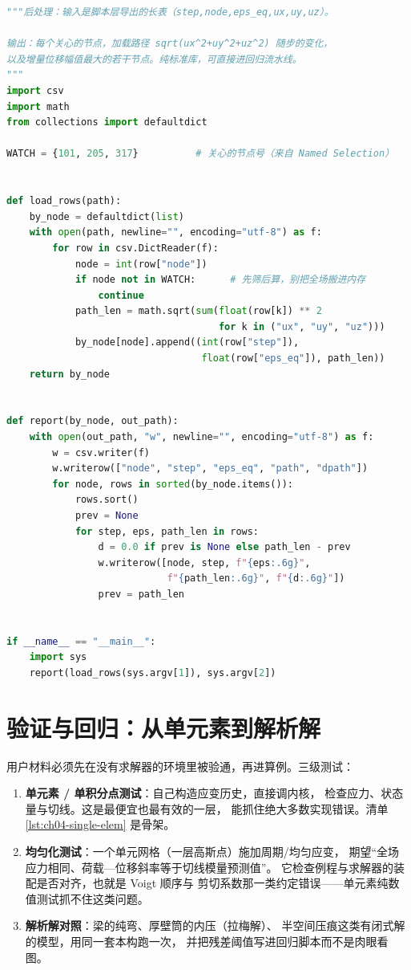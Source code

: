 \documentclass[12pt,a4paper,fontset=fandol]{ctexbook}
\begin{document}
\begin{lstlisting}[language=Python, style=pythonstyle, caption={结果后处理：从导出的长表算自定义量并只留子集}, label={lst:ch04-post}]
"""后处理：输入是脚本层导出的长表（step,node,eps_eq,ux,uy,uz）。

输出：每个关心的节点，加载路径 sqrt(ux^2+uy^2+uz^2) 随步的变化，
以及增量位移幅值最大的若干节点。纯标准库，可直接进回归流水线。
"""
import csv
import math
from collections import defaultdict

WATCH = {101, 205, 317}          # 关心的节点号（来自 Named Selection）


def load_rows(path):
    by_node = defaultdict(list)
    with open(path, newline="", encoding="utf-8") as f:
        for row in csv.DictReader(f):
            node = int(row["node"])
            if node not in WATCH:      # 先筛后算，别把全场搬进内存
                continue
            path_len = math.sqrt(sum(float(row[k]) ** 2
                                     for k in ("ux", "uy", "uz")))
            by_node[node].append((int(row["step"]),
                                  float(row["eps_eq"]), path_len))
    return by_node


def report(by_node, out_path):
    with open(out_path, "w", newline="", encoding="utf-8") as f:
        w = csv.writer(f)
        w.writerow(["node", "step", "eps_eq", "path", "dpath"])
        for node, rows in sorted(by_node.items()):
            rows.sort()
            prev = None
            for step, eps, path_len in rows:
                d = 0.0 if prev is None else path_len - prev
                w.writerow([node, step, f"{eps:.6g}",
                            f"{path_len:.6g}", f"{d:.6g}"])
                prev = path_len


if __name__ == "__main__":
    import sys
    report(load_rows(sys.argv[1]), sys.argv[2])
\end{lstlisting}

\section{验证与回归：从单元素到解析解}
\label{sec:ch04-verify}

用户材料必须先在没有求解器的环境里被验通，再进算例。三级测试：

\begin{enumerate}
  \item \textbf{单元素 / 单积分点测试}：自己构造应变历史，直接调内核，
        检查应力、状态量与切线。这是最便宜也最有效的一层，
        能抓住绝大多数实现错误。清单 \ref{lst:ch04-single-elem} 是骨架。
  \item \textbf{均匀化测试}：一个单元网格（一层高斯点）施加周期/均匀应变，
        期望``全场应力相同、荷载—位移斜率等于切线模量预测值''。
        它检查例程与求解器的装配是否对齐，也就是 Voigt 顺序与
        剪切系数那一类约定错误——单元素纯数值测试抓不住这类问题。
  \item \textbf{解析解对照}：梁的纯弯、厚壁筒的内压（拉梅解）、
        半空间压痕这类有闭式解的模型，用同一套本构跑一次，
        并把残差阈值写进回归脚本而不是肉眼看图。
\end{enumerate}
\end{document}
